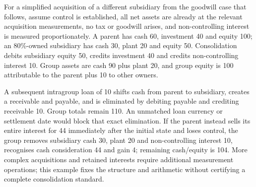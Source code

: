 For a simplified acquisition of a different subsidiary from the goodwill case
that follows, assume control is established, all net assets
are already at the relevant acquisition measurements, no tax or goodwill
arises, and non-controlling interest is measured proportionately. A parent
has cash 60, investment 40 and equity 100; an 80\%-owned subsidiary has cash
30, plant 20 and equity 50. Consolidation debits subsidiary equity 50,
credits investment 40 and credits non-controlling interest 10. Group assets
are cash 90 plus plant 20, and group equity is 100 attributable to the parent
plus 10 to other owners.

A subsequent intragroup loan of 10 shifts cash from parent to subsidiary,
creates a receivable and payable, and is eliminated by debiting payable and
crediting receivable 10. Group totals remain 110. An unmatched loan currency
or settlement date would block that exact elimination. If the parent instead
sells its entire interest for 44 immediately after the initial state and
loses control, the group removes subsidiary cash 30, plant 20 and
non-controlling interest 10, recognises cash consideration 44 and gain 4;
remaining cash/equity is 104. More complex acquisitions and retained interests
require additional measurement operations; this example fixes the structure
and arithmetic without certifying a complete consolidation standard.



